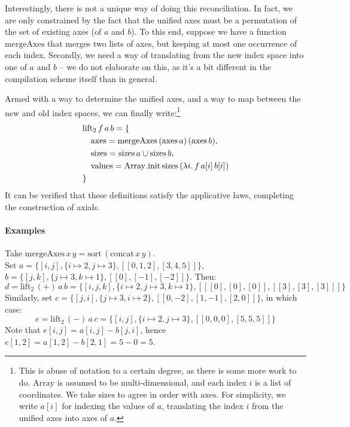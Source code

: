 Interestingly, there is not a unique way of doing this reconciliation. In fact, we are only constrained by the fact that the unified axes must be a permutation of the set of existing axes (of $a$ and $b$). To this end, suppose we have a function $\mathrm{mergeAxes}$ that merges two lists of axes, but keeping at most one occurrence of each index. Secondly, we need a way of translating from the new index space into one of $a$ and $b$ -- we do not elaborate on this, as it's a bit different in the compilation scheme itself than in general. 

Armed with a way to determine the unified axes, and a way to map between the new and old index spaces, we can finally write:\footnote{This is abuse of notation to a certain degree, as there is some more work to do. $\mathrm{Array}$ is assumed to be multi-dimensional, and each index $i$ is a list of coordinates. We take $\mathrm{sizes}$ to agree in order with $\mathrm{axes}$. For simplicity, we write $a[i]$ for indexing the values of $a$, translating the index $i$ from the unified axes into axes of $a$.}
\begin{align*} 
&\mathrm{lift}_2\,f\,a\,b = \{ \\
&\quad \mathrm{axes} = \mathrm{mergeAxes}\,(\mathrm{axes}\,a)\,(\mathrm{axes}\,b), \\
&\quad \mathrm{sizes} = \mathrm{sizes}\,a \cup \mathrm{sizes}\,b, \\
&\quad \mathrm{values} = \mathrm{Array.init}\,\mathrm{sizes}\,(\lambda i \ldotp f\, a[i]\, b[i]) \\
&\}
\end{align*}
It can be verified that these definitions satisfy the applicative laws, completing the construction of axials.

\paragraph{Examples} Take $\mathrm{mergeAxes}\,x\,y = \mathrm{sort}\,(\mathrm{concat}\,x\,y)$. \\ Set $a = \{ [i, j], \{i \mapsto 2, j \mapsto 3 \}, [[0, 1, 2], [3, 4, 5]] \} $, $b = \{ [j, k], \{ j \mapsto 3, k \mapsto 1 \}, [[0], [-1], [-2]] \}$. Then:
$$ d = \mathrm{lift}_2\,(+)\,a\,b = \{ [i,j,k], \{i \mapsto 2, j \mapsto 3, k \mapsto 1 \}, [[[0], [0], [0]], [[3], [3], [3]]] \} $$
Similarly, set $c = \{ [j, i], \{ j \mapsto 3, i \mapsto 2 \}, [[0, -2], [1, -1], [2, 0]] \}$, in which case:
$$ e = \mathrm{lift}_2\,(-)\,a\,c = \{ [i, j], \{i \mapsto 2, j \mapsto 3 \}, [[0, 0, 0], [5, 5, 5]] \} $$
Note that $e[i, j] = a[i, j] - b[j, i]$, hence $e[1, 2] = a[1, 2] - b[2, 1] = 5 - 0 = 5$. 

